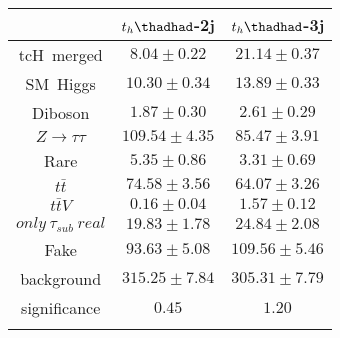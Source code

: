 
\centering
\begin{tabular}{ccc} \toprule\toprule
 & $t_{h}\thadhad$-2j & $t_{h}\thadhad$-3j\\\midrule
tcH~merged & $8.04\pm0.22$ & $21.14\pm0.37$\\
SM~Higgs & $10.30\pm0.34$ & $13.89\pm0.33$\\
Diboson & $1.87\pm0.30$ & $2.61\pm0.29$\\
$Z\to\tau\tau$ & $109.54\pm4.35$ & $85.47\pm3.91$\\
Rare & $5.35\pm0.86$ & $3.31\pm0.69$\\
$t\bar{t}$ & $74.58\pm3.56$ & $64.07\pm3.26$\\
$t\bar{t}V$ & $0.16\pm0.04$ & $1.57\pm0.12$\\
$only~\tau_{sub}~real$ & $19.83\pm1.78$ & $24.84\pm2.08$\\
Fake & $93.63\pm5.08$ & $109.56\pm5.46$\\
background & $315.25\pm7.84$ & $305.31\pm7.79$\\
significance & $0.45$ & $1.20$\\
\bottomrule\bottomrule\\
\end{tabular}